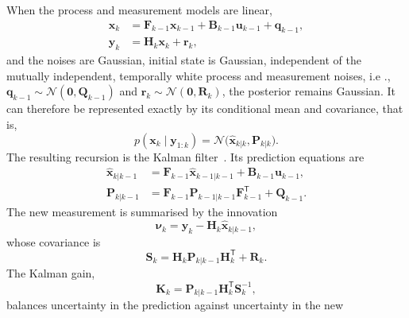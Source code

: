 \documentclass[graybox,envcountchap]{style/SNmono}
\providecommand{\DIFadd}[1]{{\protect\color{blue} #1}} %
\providecommand{\DIFdel}[1]{{\protect\color{red} #1}} %
\providecommand{\DIFaddbegin}{} %
\providecommand{\DIFaddend}{} %
\providecommand{\DIFdelbegin}{} %
\providecommand{\DIFdelend}{} %
\begin{document}
When the process and measurement models are linear,
\begin{subequations}
\begin{align}
\mathbf{x}_k &= \mathbf{F}_{k-1}\mathbf{x}_{k-1} +\mathbf{B}_{k-1}\mathbf{u}_{k-1} + \mathbf{q}_{k-1}, \label{eq:kf_linear_process}\\
\mathbf{y}_k &= \mathbf{H}_k\mathbf{x}_k+\mathbf{r}_k,
\label{eq:kf_linear_measurement}
\end{align}    
\end{subequations}
and the \DIFdelbegin \DIFdel{noises are Gaussian, }\DIFdelend \DIFaddbegin \DIFadd{initial state is Gaussian, independent of the mutually independent, temporally white process and measurement noises, }\DIFaddend i.e\DIFaddbegin \DIFadd{.}\DIFaddend , $\mathbf{q}_{k-1}\sim \mathcal{N}(\mathbf{0},\mathbf{Q}_{k-1})$ and $\mathbf{r}_k\sim \mathcal{N}(\mathbf{0},\mathbf{R}_k)$, the posterior remains Gaussian. It can therefore be represented exactly by its conditional mean and covariance, that is,
\begin{equation}
p(\mathbf{x}_k\mid\mathbf{y}_{1:k}) = \mathcal{N} \bigl(\widehat{\mathbf{x}}_{k|k}, \mathbf{P}_{k|k} \bigr).
\end{equation}
The resulting recursion is the Kalman filter~\cite{kalman_1960}. Its
prediction equations are
\begin{align}
\widehat{\mathbf{x}}_{k|k-1}
&=
\mathbf{F}_{k-1}\widehat{\mathbf{x}}_{k-1|k-1}
+
\mathbf{B}_{k-1}\mathbf{u}_{k-1},
\label{eq:kf_state_prediction}\\
\mathbf{P}_{k|k-1}
&=
\mathbf{F}_{k-1}\mathbf{P}_{k-1|k-1}
\mathbf{F}_{k-1}^{\mathsf T}
+
\mathbf{Q}_{k-1}.
\label{eq:kf_cov_prediction}
\end{align}
The new measurement is summarised by the innovation
\begin{equation}
\boldsymbol{\nu}_k
=
\mathbf{y}_k-
\mathbf{H}_k\widehat{\mathbf{x}}_{k|k-1},
\label{eq:kf_innovation}
\end{equation}
whose covariance is
\begin{equation}
\mathbf{S}_k
=
\mathbf{H}_k\mathbf{P}_{k|k-1}\mathbf{H}_k^{\mathsf T}
+
\mathbf{R}_k.
\label{eq:kf_innovation_covariance}
\end{equation}
The Kalman gain,
\begin{equation}
\mathbf{K}_k
=
\mathbf{P}_{k|k-1}\mathbf{H}_k^{\mathsf T}
\mathbf{S}_k^{-1},
\label{eq:kf_gain}
\end{equation}
balances uncertainty in the prediction against uncertainty in the new
\end{document}
